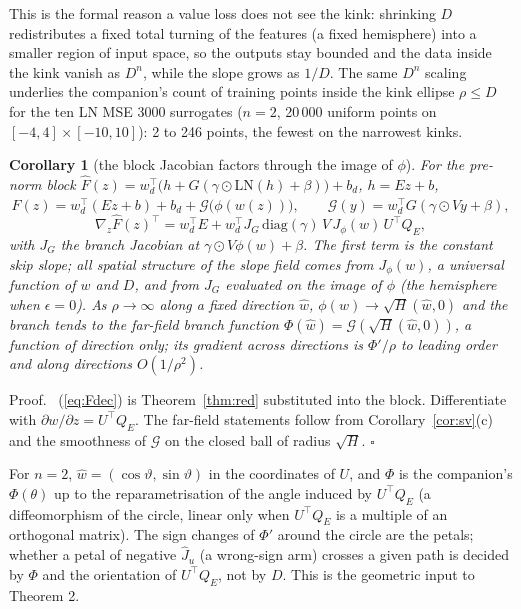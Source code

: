 \documentclass[11pt]{article}
\theoremstyle{plainnote}
\newtheorem{corollary}{Corollary}
\renewenvironment{proof}[1][Proof]{\par\noindent #1.\ }{\hfill$\square$\par}
\begin{document}
This is the formal reason a value loss does not see the kink: shrinking $D$ redistributes a fixed total turning of the features (a fixed hemisphere) into a smaller region of input space, so the outputs stay bounded and the data inside the kink vanish as $D^n$, while the slope grows as $1/D$. The same $D^n$ scaling underlies the companion's count of training points inside the kink ellipse $\rho\le D$ for the ten LN MSE 3000 surrogates ($n=2$, 20\,000 uniform points on $[-4,4]\times[-10,10]$): 2 to 246 points, the fewest on the narrowest kinks.

\begin{corollary}[the block Jacobian factors through the image of $\phi$]\label{cor:block}
For the pre-norm block $\hat F(z)=w_d^\top\big(h+G(\gamma\odot\mathrm{LN}(h)+\beta)\big)+b_d$, $h=Ez+b$,
\begin{equation}
\hat F(z)=w_d^\top(Ez+b)+b_d+\mathcal G\big(\phi(w(z))\big),\qquad \mathcal G(y)=w_d^\top G(\gamma\odot Vy+\beta),
\label{eq:Fdec}
\end{equation}
\begin{equation}
\nabla_z\hat F(z)^\top=w_d^\top E+w_d^\top J_G\,\mathrm{diag}(\gamma)\,V\,J_\phi(w)\,U^\top Q_E,
\label{eq:jac}
\end{equation}
with $J_G$ the branch Jacobian at $\gamma\odot V\phi(w)+\beta$. The first term is the constant skip slope; all spatial structure of the slope field comes from $J_\phi(w)$, a universal function of $w$ and $D$, and from $J_G$ evaluated on the image of $\phi$ (the hemisphere when $\epsilon=0$). As $\rho\to\infty$ along a fixed direction $\hat w$, $\phi(w)\to\sqrt H(\hat w,0)$ and the branch tends to the far-field branch function $\Phi(\hat w)=\mathcal G(\sqrt H(\hat w,0))$, a function of direction only; its gradient across directions is $\Phi'/\rho$ to leading order and along directions $O(1/\rho^2)$.
\end{corollary}

\begin{proof}
(\ref{eq:Fdec}) is Theorem~\ref{thm:red} substituted into the block. Differentiate with $\partial w/\partial z=U^\top Q_E$. The far-field statements follow from Corollary~\ref{cor:sv}(c) and the smoothness of $\mathcal G$ on the closed ball of radius $\sqrt H$.
\end{proof}

For $n=2$, $\hat w=(\cos\vartheta,\sin\vartheta)$ in the coordinates of $U$, and $\Phi$ is the companion's $\Phi(\theta)$ up to the reparametrisation of the angle induced by $U^\top Q_E$ (a diffeomorphism of the circle, linear only when $U^\top Q_E$ is a multiple of an orthogonal matrix). The sign changes of $\Phi'$ around the circle are the petals; whether a petal of negative $\hat J_u$ (a wrong-sign arm) crosses a given path is decided by $\Phi$ and the orientation of $U^\top Q_E$, not by $D$. This is the geometric input to Theorem 2.
\end{document}
